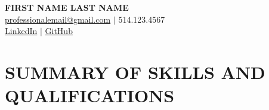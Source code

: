 \documentclass[a4paper,10pt]{article}
\begin{document}
% 
\begin{center} %
    {\LARGE \textbf{FIRST NAME LAST NAME}} \\
    \href{mailto:professionalemail@gmail.com}{professionalemail@gmail.com} $\mid$ 514.123.4567 \\
    \href{https://www.linkedin.com/in/yourlinkedinprofile}{LinkedIn} $\mid$ \href{https://github.com/yourgithub}{GitHub}
\end{center}

\section*{SUMMARY OF SKILLS AND QUALIFICATIONS}

\end{document}
